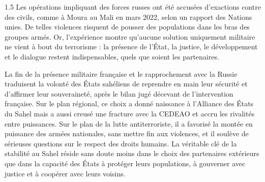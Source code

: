 \documentclass[12pt]{article}
\begin{document}
\begin{spacing}{1.5}
Les opérations impliquant des forces russes ont été accusées d'exactions contre des civils, comme à Moura au Mali en mars 2022, selon un rapport des Nations unies. De telles violences risquent de pousser des populations dans les bras des groupes armés. Or, l'expérience montre qu'aucune solution uniquement militaire ne vient à bout du terrorisme : la présence de l'État, la justice, le développement et le dialogue restent indispensables, quels que soient les partenaires.


La fin de la présence militaire française et le rapprochement avec la Russie traduisent la volonté des États sahéliens de reprendre en main leur sécurité et d'affirmer leur souveraineté, après le bilan jugé décevant de l'intervention française. Sur le plan régional, ce choix a donné naissance à l'Alliance des États du Sahel mais a aussi creusé une fracture avec la CEDEAO et accru les rivalités entre puissances. Sur le plan de la lutte antiterroriste, il a favorisé la montée en puissance des armées nationales, sans mettre fin aux violences, et il soulève de sérieuses questions sur le respect des droits humains. La véritable clé de la stabilité au Sahel réside sans doute moins dans le choix des partenaires extérieurs que dans la capacité des États à protéger leurs populations, à gouverner avec justice et à coopérer avec leurs voisins.

\end{spacing}
\end{document}
